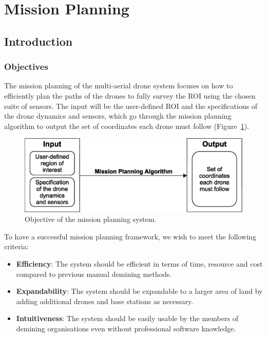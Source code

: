 \newpage
{}
\section{Mission Planning} \label{sec:msp}

\subsection{Introduction}
\label{sec:msp_introduction}

\subsubsection{Objectives}
\label{sec:msp_objectives}

The mission planning of the multi-aerial drone system focuses on how to efficiently plan the paths of the drones to fully survey the \gls{ROI} using the chosen suite of sensors. The input will be the user-defined \gls{ROI} and the specifications of the drone dynamics and sensors, which go through the mission planning algorithm to output the set of coordinates each drone must follow (Figure~\ref{fig:msp_objective}).

\begin{figure}[h!]
    \centering
    \includegraphics[width=0.7\linewidth]{figs/Jihwan/Objective of the Mission Planning System.eps}
    \caption[Objective of the Mission Planning System]
    {Objective of the mission planning system.}
    \label{fig:msp_objective}
\end{figure}

To have a successful mission planning framework, we wish to meet the following criteria:

\begin{itemize}
    \item \textbf{Efficiency}: The system should be efficient in terms of time, resource and cost compared to previous manual demining methods. 
    \item \textbf{Expandability}: The system should be expandable to a larger area of land by adding additional drones and base stations as necessary. 
    \item \textbf{Intuitiveness}: The system should be easily usable by the members of demining organisations even without professional software knowledge. 
\end{itemize}

